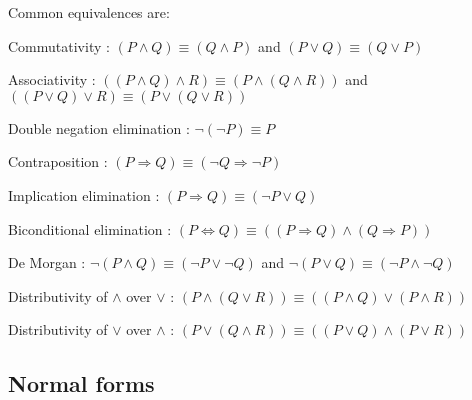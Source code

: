 \begin{description}
       Common equivalences are:
       \begin{descriptionlist}
            \footnotesize
            \item[Commutativity]: $(P \land Q) \equiv (Q \land P)$ and $(P \vee Q) \equiv (Q \vee P)$
            \item[Associativity]: $((P \land Q) \land R) \equiv (P \land (Q \land R))$
                and $((P \vee Q) \vee R) \equiv (P \vee (Q \vee R))$
            \item[Double negation elimination]: $\lnot(\lnot P) \equiv P$
            \item[Contraposition]: $(P \Rightarrow Q) \equiv (\lnot Q \Rightarrow \lnot P)$
            \item[Implication elimination]: $(P \Rightarrow Q) \equiv (\lnot P \vee Q)$
            \item[Biconditional elimination]: $(P \Leftrightarrow Q) \equiv ((P \Rightarrow Q) \land (Q \Rightarrow P))$
            \item[De Morgan]: $\lnot(P \land Q) \equiv (\lnot P \vee \lnot Q)$ and $\lnot(P \vee Q) \equiv (\lnot P \land \lnot Q)$
            \item[Distributivity of $\land$ over $\vee$]: $(P \land (Q \vee R)) \equiv ((P \land Q) \vee (P \land R))$
            \item[Distributivity of $\vee$ over $\land$]: $(P \vee (Q \land R)) \equiv ((P \vee Q) \land (P \vee R))$
       \end{descriptionlist}
\end{description}


\subsection{Normal forms}


